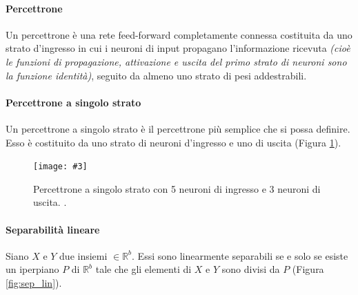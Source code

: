\documentclass[12pt, twoside, letterpaper]{report}
\newcommand{\img}[4] {
	\begin{figure}
		\centering
		\texttt{[image: \#3]}\\
		\caption{#1}
		\label{fig:#4}
	\end{figure}
}
\begin{document}
			\paragraph{Percettrone} Un percettrone è una rete feed-forward completamente connessa costituita da uno strato d'ingresso in cui i neuroni di input propagano l'informazione ricevuta \textit{(cioè le funzioni di propagazione, attivazione e uscita del primo strato di neuroni sono la funzione identità)}, seguito da almeno uno strato di pesi addestrabili.
			
			\paragraph{Percettrone a singolo strato} Un percettrone a singolo strato è il percettrone più semplice che si possa definire. Esso è costituito da uno strato di neuroni d'ingresso e uno di uscita (Figura \ref{fig:slp}). 
				\img{Percettrone a singolo strato con 5 neuroni di ingresso e 3 neuroni di uscita. \cite{kriesel}.}{0.5}{slp.png}{slp} 
				
			\paragraph{Separabilità lineare} Siano $X$ e $Y$ due insiemi $\in \mathbb{R}^b$. Essi sono linearmente separabili se e solo se esiste un iperpiano $P$ di $\mathbb{R}^b$ tale che gli elementi di $X$ e $Y$ sono divisi da $P$ (Figura \ref{fig:sep_lin}). 
			
\end{document}
